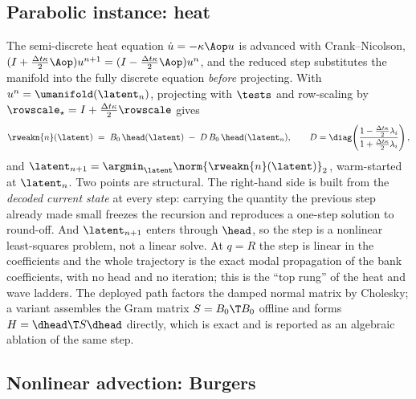 \subsection{Parabolic instance: heat}
\label{app:method:heat}

The semi-discrete heat equation $\dot u=-\kappa\Aop u$ is advanced with
Crank--Nicolson,
$(I+\tfrac{\Delta t\kappa}{2}\Aop)u^{n+1}=(I-\tfrac{\Delta t\kappa}{2}\Aop)u^{n}$,
and the reduced step substitutes the manifold into the fully discrete equation
\emph{before} projecting. With $u^{n}=\umanifold(\latent_n)$, projecting with
$\tests$ and row-scaling by $\rowscale_\star=I+\tfrac{\Delta t\kappa}{2}\rowscale$
gives
\begin{equation}
  \rweakn{n}(\latent)
  \;=\;
  B_0\,\head(\latent) \;-\; D\,B_0\,\head(\latent_n),
  \qquad
  D=\diag\!\left(\frac{1-\tfrac{\Delta t\kappa}{2}\lambda_i}
                      {1+\tfrac{\Delta t\kappa}{2}\lambda_i}\right),
  \label{eq:heat-step}
\end{equation}
and $\latent_{n+1}=\argmin_{\latent}\norm{\rweakn{n}(\latent)}_2$, warm-started
at $\latent_n$. Two points are structural. The right-hand side is built from
the \emph{decoded current state} at every step: carrying the quantity the
previous step already made small freezes the recursion and reproduces a
one-step solution to round-off. And $\latent_{n+1}$ enters through $\head$, so
the step is a nonlinear least-squares problem, not a linear solve.
At $q=R$ the step is linear in the coefficients and the whole trajectory is the
exact modal propagation of the bank coefficients, with no head and no
iteration; this is the ``top rung'' of the heat and wave ladders. The deployed
path factors the damped normal matrix by Cholesky; a variant assembles the Gram
matrix $S=B_0\T B_0$ offline and forms $H=\dhead\T S\dhead$ directly, which is
exact and is reported as an algebraic ablation of the same step.

\subsection{Nonlinear advection: Burgers}
\label{app:method:burgers}

